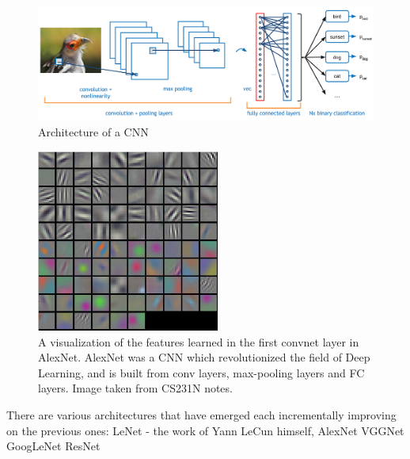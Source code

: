 \begin{figure}[!ht]
    \centering
    \includegraphics[width=150mm, keepaspectratio]{figures/convnet.png}
    \caption{Architecture of a CNN}
    \label{fig:convnet}
\end{figure}

\begin{figure}[!ht]
    \centering
    \includegraphics[width=60mm, keepaspectratio]{figures/filters.png}
    \caption{A visualization of the features learned in the first convnet layer in AlexNet\cite{NIPS2012_4824}. AlexNet was a CNN which revolutionized the field of Deep Learning, and is built from conv layers, max-pooling layers and FC layers. Image taken from CS231N notes.}
    \label{fig:filters}
\end{figure}

There are various architectures that have emerged each incrementally improving on the previous ones:
LeNet\cite{Lecun98gradient-basedlearning} - the work of Yann LeCun himself,
AlexNet\cite{NIPS2012_4824}
VGGNet\cite{DBLP:journals/corr/SimonyanZ14a}
GoogLeNet\cite{DBLP:journals/corr/SzegedyLJSRAEVR14}
ResNet\cite{DBLP:journals/corr/HeZRS15}

